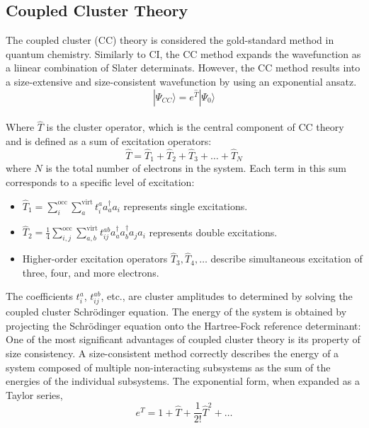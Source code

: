 \subsection{Coupled Cluster Theory} \label{sec:CCTheory}
The coupled cluster (CC) theory is considered the gold-standard method in quantum chemistry. Similarly to CI, the CC method expands the wavefunction as a liinear combination of Slater determinats. However, the CC method results into a size-extensive and size-consistent wavefunction by using an exponential ansatz.
\begin{equation}\label{CCWavefunc}
    | \Psi_{CC} \rangle = e^{\hat{T}} | \Psi_{0} \rangle
\end{equation}
\\Where $\hat{T}$ is the cluster operator, which is the central component of CC theory and is defined as a sum of excitation operators:
\begin{equation}
    \hat{T} = \hat{T}_1 + \hat{T}_2 + \hat{T}_3 + \dots + \hat{T}_N
\end{equation}
where $N$ is the total number of electrons in the system. Each term in this sum corresponds to a specific level of excitation:
\begin{itemize}
    \item $\hat{T}_1 = \sum_{i}^{\text{occ}} \sum_{a}^{\text{virt}} t_i^a a_a^{\dagger} a_i$ represents single excitations.
    \item $\hat{T}_2 = \frac{1}{4} \sum_{i,j}^{\text{occ}} \sum_{a,b}^{\text{virt}} t_{ij}^{ab} a_a^{\dagger} a_b^{\dagger} a_j a_i$ represents double excitations.
    \item Higher-order excitation operators $\hat{T}_3, \hat{T}_4, \dots$ describe simultaneous excitation of three, four, and more electrons.
\end{itemize}
The coefficients $t_i^a$, $t_{ij}^{ab}$, etc., are cluster amplitudes to determined by solving the coupled cluster Schr\"{o}dinger equation. The energy of the system is obtained by projecting the Schrödinger equation onto the Hartree-Fock reference determinant:
\iffalse One of the most significant advantages of coupled cluster theory is its property of size consistency. A size-consistent method correctly describes the energy of a system composed of multiple non-interacting subsystems as the sum of the energies of the individual subsystems. The exponential form, when expanded as a Taylor series,
\begin{equation}
    e^{\hat{T}} = 1 + \hat{T} + \frac{1}{2!} \hat{T}^2 + \dots
\end{equation}
